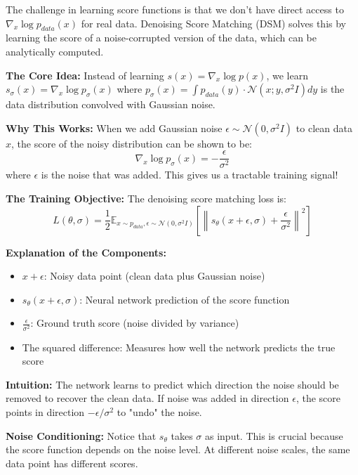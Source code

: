 \documentclass[12pt,a4paper]{article}
\begin{document}
The challenge in learning score functions is that we don't have direct access to $\nabla_x \log p_{data}(x)$ for real data. Denoising Score Matching (DSM) solves this by learning the score of a noise-corrupted version of the data, which can be analytically computed.

\textbf{The Core Idea:} Instead of learning $s(x) = \nabla_x \log p(x)$, we learn $s_\sigma(x) = \nabla_x \log p_\sigma(x)$ where $p_\sigma(x) = \int p_{data}(y) \cdot \mathcal{N}(x; y, \sigma^2 I) dy$ is the data distribution convolved with Gaussian noise.

\textbf{Why This Works:} When we add Gaussian noise $\epsilon \sim \mathcal{N}(0, \sigma^2 I)$ to clean data $x$, the score of the noisy distribution can be shown to be:
\begin{equation}
\nabla_x \log p_\sigma(x) = -\frac{\epsilon}{\sigma^2}
\end{equation}
where $\epsilon$ is the noise that was added. This gives us a tractable training signal!

\textbf{The Training Objective:} The denoising score matching loss is:
\begin{equation}
L(\theta, \sigma) = \frac{1}{2}\mathbb{E}_{x \sim p_{data}, \epsilon \sim \mathcal{N}(0,\sigma^2I)} \left[\left\|s_\theta(x+\epsilon, \sigma) + \frac{\epsilon}{\sigma^2}\right\|^2\right]
\end{equation}

\textbf{Explanation of the Components:}
\begin{itemize}
    \item $x + \epsilon$: Noisy data point (clean data plus Gaussian noise)
    \item $s_\theta(x+\epsilon, \sigma)$: Neural network prediction of the score function
    \item $\frac{\epsilon}{\sigma^2}$: Ground truth score (noise divided by variance)
    \item The squared difference: Measures how well the network predicts the true score
\end{itemize}

\textbf{Intuition:} The network learns to predict which direction the noise should be removed to recover the clean data. If noise was added in direction $\epsilon$, the score points in direction $-\epsilon/\sigma^2$ to "undo" the noise.

\textbf{Noise Conditioning:} Notice that $s_\theta$ takes $\sigma$ as input. This is crucial because the score function depends on the noise level. At different noise scales, the same data point has different scores.
\end{document}
